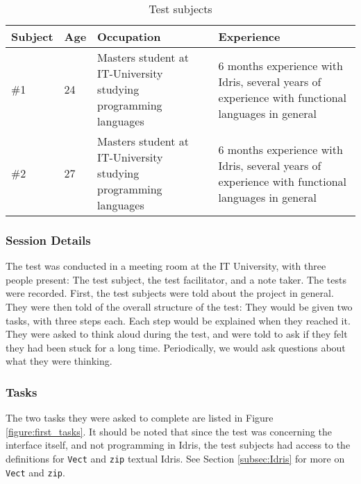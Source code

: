 \begin{table}[h]
\centering
\begin{tabular}{| l | l | p{5cm} | p{5cm} |}
\hline
Subject & Age & Occupation & Experience \\ \hline
\#1 & 24 & Masters student at IT-University studying programming languages & 6 months experience with Idris, several years of experience with functional languages in general \\ \hline
\#2 & 27 & Masters student at IT-University studying programming languages & 6 months experience with Idris, several years of experience with functional languages in general \\ \hline
\end{tabular}
\caption {Test subjects}
\label{table:first_test_subjects}
\end{table}

\subsubsection{Session Details}
The test was conducted in a meeting room at the IT University, with three
people present: The test subject, the test facilitator, and a note taker. The
tests were recorded. First, the test subjects were told about the project in
general. They were then told of the overall structure of the test: They would
be given two tasks, with three steps each. Each step would be explained when
they reached it. They were asked to think aloud during the test, and were told to
ask if they felt they had been stuck for a long time. Periodically, we would
ask questions about what they were thinking.

\subsubsection{Tasks}
The two tasks they were asked to complete are listed in Figure \ref{figure:first_tasks}.
It should be noted that since the test was concerning the interface itself, and
not programming in Idris, the test subjects had access to the definitions for \texttt{Vect} and \texttt{zip} textual Idris. See Section \ref{subsec:Idris}
for more on \texttt{Vect} and \texttt{zip}.

